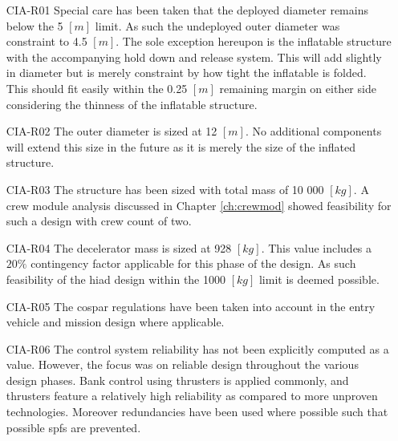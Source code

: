 \begin{itemize}[leftmargin=+20mm]
\item[CIA-R01] Special care has been taken that the deployed diameter remains below the 5 $[m]$ limit. As such the undeployed outer diameter was constraint to 4.5 $[m]$. The sole exception hereupon is the inflatable structure with the accompanying hold down and release system. This will add slightly in diameter but is merely constraint by how tight the inflatable is folded. This should fit easily within the 0.25 $[m]$ remaining margin on either side considering the thinness of the inflatable structure. 
\item[CIA-R02] The outer diameter is sized at 12 $[m]$. No additional components will extend this size in the future as it is merely the size of the inflated structure.
\item[CIA-R03] The structure has been sized with total mass of 10 000 $[kg]$. A crew module analysis discussed in Chapter \ref{ch:crewmod} showed feasibility for such a design with crew count of two.
\item[CIA-R04] The decelerator mass is sized at 928 $[kg]$. This value includes a $20\%$ contingency factor applicable for this phase of the design. As such feasibility of the \gls{hiad} design within the 1000 $[kg]$ limit is deemed possible.
\item[CIA-R05] The \gls{cospar} regulations have been taken into account in the entry vehicle and mission design where applicable.
\item[CIA-R06] The control system reliability has not been explicitly computed as a value. However, the focus was on reliable design throughout the various design phases. Bank control using thrusters is applied commonly, and thrusters feature a relatively high reliability as compared to more unproven technologies. Moreover redundancies have been used where possible such that possible \glspl{spf} are prevented. 
\end{itemize}


